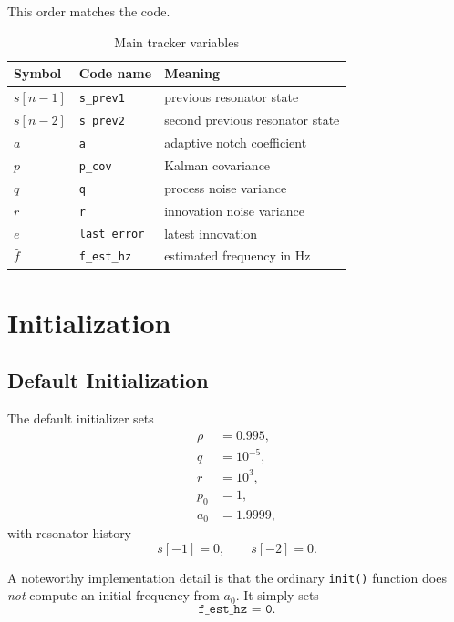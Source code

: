 \documentclass[conference]{IEEEtran}
\begin{document}
This order matches the code.

\begin{table}[t]
  \centering
  \caption{Main tracker variables}
  \label{tab:vars}
  \small
  \begin{tabular}{@{}lll@{}}
    \toprule
    Symbol & Code name & Meaning \\
    \midrule
    $s[n-1]$ & \texttt{s\_prev1} & previous resonator state \\
    $s[n-2]$ & \texttt{s\_prev2} & second previous resonator state \\
    $a$ & \texttt{a} & adaptive notch coefficient \\
    $p$ & \texttt{p\_cov} & Kalman covariance \\
    $q$ & \texttt{q} & process noise variance \\
    $r$ & \texttt{r} & innovation noise variance \\
    $e$ & \texttt{last\_error} & latest innovation \\
    $\hat f$ & \texttt{f\_est\_hz} & estimated frequency in Hz \\
    \bottomrule
  \end{tabular}
\end{table}

\section{Initialization}\label{sec:init}

\subsection{Default Initialization}

The default initializer sets
\begin{align}
  \rho &= 0.995,\\
  q &= 10^{-5},\\
  r &= 10^3,\\
  p_0 &= 1,\\
  a_0 &= 1.9999,
\end{align}
with resonator history
\begin{equation}
  s[-1]=0,\qquad s[-2]=0.
\end{equation}

A noteworthy implementation detail is that the ordinary \texttt{init()}
function does \emph{not} compute an initial frequency from $a_0$. It simply
sets
\begin{equation}
  \texttt{f\_est\_hz = 0}.
\end{equation}
\end{document}
